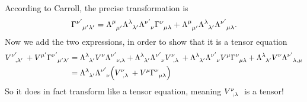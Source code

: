 \documentclass[gr-notes.tex]{subfiles}
\begin{document}
According to Carroll, the precise transformation is
%
\begin{displaymath}
  \tensor{\Gamma}{^{\nu'}_{\mu'\lambda'}} =
  \tensor{\Lambda}{^\mu_{\mu'}}
  \tensor{\Lambda}{^\lambda_{\lambda'}}
  \tensor{\Lambda}{^{\nu'}_\nu}
  \tensor{\Gamma}{^\nu_{\mu\lambda}} +
  \tensor{\Lambda}{^\mu_{\mu'}}
  \tensor{\Lambda}{^\lambda_{\lambda'}}
  \tensor{\Lambda}{^{\nu'}_{\mu\lambda}}.
\end{displaymath}
%
Now we add the two expressions, in order to show that it is a tensor equation
%
\begin{align*}
  \tensor{V}{^{\nu'}_{,\lambda'}} +
  V^{\mu'} \tensor{\Gamma}{^{\nu'}_{\mu'\lambda'}} &=
  \tensor{\Lambda}{^\lambda_{\lambda'}}
  V^\nu \tensor{\Lambda}{^{\nu'}_{\nu,\lambda}} +
  \tensor{\Lambda}{^\lambda_{\lambda'}}
  \tensor{\Lambda}{^{\nu'}_\nu} \tensor{V}{^\nu_{,\lambda}} +
  \tensor{\Lambda}{^\lambda_{\lambda'}}
  \tensor{\Lambda}{^{\nu'}_\nu} V^\mu
  \tensor{\Gamma}{^\nu_{\mu\lambda}} +
  \tensor{\Lambda}{^\lambda_{\lambda'}}
  V^\nu \tensor{\Lambda}{^{\nu'}_{\lambda,\mu}}
  \\ &=
  \tensor{\Lambda}{^\lambda_{\lambda'}}
  \tensor{\Lambda}{^{\nu'}_\nu}
  \qty(
    \tensor{V}{^\nu_{,\lambda}} +
    V^\mu \tensor{\Gamma}{^\nu_{\mu\lambda}}
  )
\end{align*}
%
So it does in fact transform like a tensor equation, meaning $\tensor{V}{^\nu_{;\lambda}}$ is a tensor!
\end{document}
